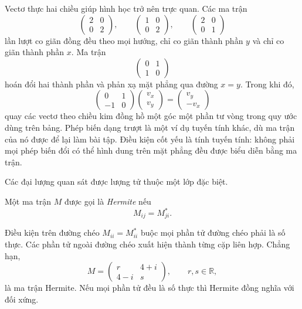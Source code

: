 Vectơ thực hai chiều giúp hình học trở nên trực quan. Các ma trận
\begin{equation}
  \begin{pmatrix}2&0\\0&2\end{pmatrix},
  \qquad
  \begin{pmatrix}1&0\\0&2\end{pmatrix},
  \qquad
  \begin{pmatrix}2&0\\0&1\end{pmatrix}
\end{equation}
lần lượt co giãn đồng đều theo mọi hướng, chỉ co giãn thành phần \(y\) và chỉ co giãn thành phần \(x\). Ma trận
\begin{equation}
  \begin{pmatrix}0&1\\1&0\end{pmatrix}
\end{equation}
hoán đổi hai thành phần và phản xạ mặt phẳng qua đường \(x=y\). Trong khi đó,
\begin{equation}
  \begin{pmatrix}0&1\\-1&0\end{pmatrix}
  \begin{pmatrix}v_x\\v_y\end{pmatrix}
  =
  \begin{pmatrix}v_y\\-v_x\end{pmatrix}
  \label{eq:l02-quarter-turn}
\end{equation}
quay các vectơ theo chiều kim đồng hồ một góc một phần tư vòng trong quy ước dùng trên bảng. Phép biến dạng trượt là một ví dụ tuyến tính khác, dù ma trận của nó được để lại làm bài tập. Điều kiện cốt yếu là tính tuyến tính: không phải mọi phép biến đổi có thể hình dung trên mặt phẳng đều được biểu diễn bằng ma trận.

Các đại lượng quan sát được lượng tử thuộc một lớp đặc biệt.

\begin{definition}
Một ma trận \(M\) được gọi là \emph{Hermite} nếu
\begin{equation}
  M_{ij}=M_{ji}^*.
  \label{eq:l02-hermitian-condition}
\end{equation}
\end{definition}

Điều kiện trên đường chéo \(M_{ii}=M_{ii}^*\) buộc mọi phần tử đường chéo phải là số thực. Các phần tử ngoài đường chéo xuất hiện thành từng cặp liên hợp. Chẳng hạn,
\begin{equation}
  M=
  \begin{pmatrix}
    r&4+i\\
    4-i&s
  \end{pmatrix},
  \qquad r,s\in\mathbb R,
  \label{eq:l02-hermitian-example}
\end{equation}
là ma trận Hermite. Nếu mọi phần tử đều là số thực thì Hermite đồng nghĩa với đối xứng.

